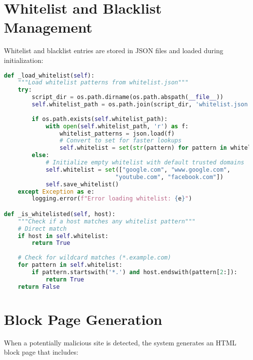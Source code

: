 \section{Whitelist and Blacklist Management}

Whitelist and blacklist entries are stored in JSON files and loaded during initialization:

\begin{lstlisting}[language=Python, caption=Whitelist Loading and Checking]
def _load_whitelist(self):
    """Load whitelist patterns from whitelist.json"""
    try:
        script_dir = os.path.dirname(os.path.abspath(__file__))
        self.whitelist_path = os.path.join(script_dir, 'whitelist.json')
        
        if os.path.exists(self.whitelist_path):
            with open(self.whitelist_path, 'r') as f:
                whitelist_patterns = json.load(f)
                # Convert to set for faster lookups
                self.whitelist = set(str(pattern) for pattern in whitelist_patterns)
        else:
            # Initialize empty whitelist with default trusted domains
            self.whitelist = set(["google.com", "www.google.com", 
                                "youtube.com", "facebook.com"])
            self.save_whitelist()
    except Exception as e:
        logging.error(f"Error loading whitelist: {e}")

def _is_whitelisted(self, host):
    """Check if a host matches any whitelist pattern"""
    # Direct match
    if host in self.whitelist:
        return True
        
    # Check for wildcard matches (*.example.com)
    for pattern in self.whitelist:
        if pattern.startswith('*.') and host.endswith(pattern[2:]):
            return True
    return False
\end{lstlisting}

\section{Block Page Generation}

When a potentially malicious site is detected, the system generates an HTML block page that includes:

